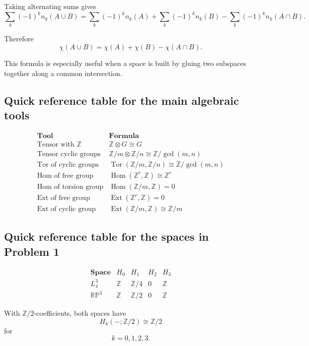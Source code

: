 \documentclass[12pt,a4paper]{article}
\theoremstyle{notespace}
\begin{document}
Taking alternating sums gives
\[
\sum_k(-1)^k n_k(A\cup B)
=
\sum_k(-1)^k n_k(A)
+
\sum_k(-1)^k n_k(B)
-
\sum_k(-1)^k n_k(A\cap B).
\]

Therefore
\[
\chi(A\cup B)=\chi(A)+\chi(B)-\chi(A\cap B).
\]

This formula is especially useful when a space is built by gluing two subspaces together along a common intersection.

\subsection{Quick reference table for the main algebraic tools}

\[
\begin{array}{c|c}
	\textbf{Tool} & \textbf{Formula} \\ \hline
	\text{Tensor with } \mathbb Z
	&
	\mathbb Z\otimes G\cong G
	\\[1mm]
	\text{Tensor cyclic groups}
	&
	\mathbb Z/m\otimes \mathbb Z/n
	\cong
	\mathbb Z/\gcd(m,n)
	\\[1mm]
	\text{Tor of cyclic groups}
	&
	\operatorname{Tor}(\mathbb Z/m,\mathbb Z/n)
	\cong
	\mathbb Z/\gcd(m,n)
	\\[1mm]
	\text{Hom of free group}
	&
	\operatorname{Hom}(\mathbb Z^r,\mathbb Z)
	\cong
	\mathbb Z^r
	\\[1mm]
	\text{Hom of torsion group}
	&
	\operatorname{Hom}(\mathbb Z/m,\mathbb Z)=0
	\\[1mm]
	\text{Ext of free group}
	&
	\operatorname{Ext}(\mathbb Z^r,\mathbb Z)=0
	\\[1mm]
	\text{Ext of cyclic group}
	&
	\operatorname{Ext}(\mathbb Z/m,\mathbb Z)
	\cong
	\mathbb Z/m
\end{array}
\]

\subsection{Quick reference table for the spaces in Problem 1}

\[
\begin{array}{c|cccc}
	\textbf{Space} & H_0 & H_1 & H_2 & H_3 \\ \hline
	L_4^3
	&
	\mathbb Z
	&
	\mathbb Z/4
	&
	0
	&
	\mathbb Z
	\\[1mm]
	\mathbb{RP}^3
	&
	\mathbb Z
	&
	\mathbb Z/2
	&
	0
	&
	\mathbb Z
\end{array}
\]

With \(\mathbb Z/2\)-coefficients, both spaces have
\[
H_k(-;\mathbb Z/2)\cong \mathbb Z/2
\]
for
\[
k=0,1,2,3.
\]
\end{document}
